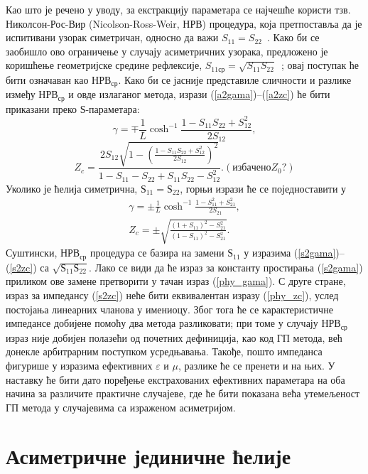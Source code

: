 Као што је речено у уводу, за екстракцију параметара се најчешће користи тзв. Николсон-Рос-Вир (Nicolson-Ross-Weir, НРВ) процедура, која претпоставља да је испитивани узорак симетричан, односно да важи $S_{11}=S_{22}$~\cite{Nicol:70, Weir:74, Smith:02}. Како би се заобишло ово ограничење у случају асиметричних узорака, предложено је коришћење геометријске средине рефлексије, $S_{11ср}=\sqrt{S_{11}S_{22}}$~\cite{smith:05}; овај поступак ће бити означаван као $НРВ_{ср}$. Како би се јасније представиле сличности и разлике између $НРВ_{ср}$ и овде излаганог метода, изрази (\ref{a2gama})--(\ref{a2zc}) ће бити приказани преко $Ѕ$-параметара:
\begin{equation}\label{phy_gama}
\gamma=\mp\frac{1}{L}\cosh^{-1}{\frac{1-S_{11}S_{22}+S_{12}^2}{2S_{12}}},%
\end{equation}
\begin{equation}\label{phy_zc}
Z_{c} = \frac{2S_{12}\sqrt{1-\left( \frac{1-S_{11}S_{22}+S_{12}^2}{2S_{12}} \right)^2}}{1-S_{11}-S_{22}+S_{11}S_{22}-S_{12}^2}. (избачено Z_0?)
\end{equation}
Уколико је ћелија симетрична, $Ѕ_{11}=Ѕ_{22}$, горњи изрази ће се поједноставити у
\begin{eqnarray}
\gamma = \pm\frac{1}{L}\cosh^{-1}\frac{1-S_{11}^2+S_{21}^2}{2S_{21}},\label{s2gama} \\
Z_c = \pm \sqrt{\frac{(1+S_{11})^2-S_{21}^2}{(1-S_{11})^2-S_{21}^2}}\label{s2zc}.
\end{eqnarray}
Суштински, $НРВ_{ср}$ процедура се базира на замени $Ѕ_{11}$ у изразима (\ref{s2gama})--(\ref{s2zc}) са $\sqrt{Ѕ_{11}Ѕ_{22}}$. Лако се види да ће израз за константу простирања (\ref{s2gama}) приликом ове замене претворити у тачан израз (\ref{phy_gama}). С друге стране, израз за импедансу (\ref{s2zc}) неће бити еквивалентан изразу (\ref{phy_zc}), услед постојања линеарних чланова у имениоцу. Због тога ће се карактеристичне импедансе добијене помоћу два метода разликовати; при томе у случају $НРВ_{ср}$ израз није добијен полазећи од почетних дефиниција, као код ГП метода, већ донекле арбитрарним поступком усредњавања. Такође, пошто импеданса фигурише у изразима ефективних $\varepsilon$ и $\mu$, разлике ће се пренети и на њих. У наставку ће бити дато поређење екстрахованих ефективних параметара на оба начина за различите практичне случајеве, где ће бити показана већа утемељеност ГП метода у случајевима са израженом асиметријом.

\section{Асиметричне јединичне ћелије}\label{sekc3}

